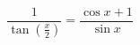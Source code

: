 \begin{displaymath}
 \dfrac{1}{\tan\left( \frac{x}{2}\right)}= \dfrac{\cos x +1}{\sin x}
\end{displaymath}
